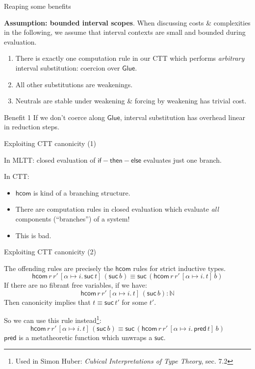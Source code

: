 \documentclass[dvipsnames]{beamer}
\newcommand{\ms}[1]{\mathsf{#1}}
\newcommand{\mbb}[1]{\mathbb{#1}}
\newcommand{\suc}{\ms{suc}}
\newcommand{\hcom}{\ms{hcom}}
\newcommand{\Glue}{\ms{Glue}}
\begin{document}
\begin{frame}{Reaping some benefits}

\textbf{Assumption: bounded interval scopes}. When discussing costs \&
complexities in the following, we assume that interval contexts are small and
bounded during evaluation.
\vspace{1em}
\pause

\begin{enumerate}
\item There is exactly one computation rule in our CTT which performs \emph{arbitrary}
      interval substitution: coercion over $\Glue$.
\pause
\item All other substitutions are weakenings.
\pause
\item Neutrals are stable under weakening \& forcing by weakening has trivial cost.

\end{enumerate}
\vspace{1em}
\pause
\begin{block}{Benefit 1}
  If we don't coerce along $\Glue$, interval substitution has overhead linear in
  reduction steps.
\end{block}

\end{frame}

\begin{frame}{Exploiting CTT canonicity (1)}

In MLTT: closed evaluation of $\ms{if}\!-\!\ms{then}\!-\!\ms{else}$
evaluates just one branch.
\vspace{1em}
\pause

In CTT:
\begin{itemize}
 \item $\hcom$ is kind of a branching structure.
 \pause
 \item There are computation rules in closed evaluation which evaluate \emph{all}
       components (``branches'') of a system!
 \pause
 \item This is bad.
\end{itemize}

\end{frame}

\begin{frame}{Exploiting CTT canonicity (2)}

The offending rules are precisely the $\hcom$ rules for strict inductive types.
\[ \hcom\,r\,r'\,[\alpha \mapsto i.\,\suc\,t]\,(\suc\,b) \equiv
   \suc\,(\hcom\,r\,r'\,[\alpha \mapsto i.\,t]\,b) \]
\pause
If there are no fibrant free variables, if we have:
\[ \hcom\,r\,r'\,[\alpha \mapsto i.\,t]\,(\suc\,b) : \mbb{N} \]
Then canonicity implies that $t \equiv \suc\,t'$ for some $t'$.
\vspace{0.5em}
\pause

So we can use this rule instead\footnote<3->{Used in Simon Huber: \emph{Cubical Interpretations of Type Theory}, sec. 7.2}:
\[ \hcom\,r\,r'\,[\alpha \mapsto i.\,t]\,(\suc\,b) \equiv
   \suc\,(\hcom\,r\,r'\,[\alpha \mapsto i.\,\ms{pred}\,t]\,b) \]
$\ms{pred}$ is a metatheoretic function which unwraps a $\suc$.
\end{frame}
\end{document}
